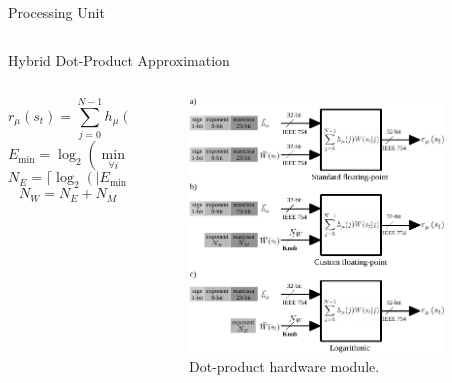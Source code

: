 \begin{frame}{Processing Unit}
\begin{columns}[c]
	\end{columns}
\end{frame}

\begin{frame}{Hybrid Dot-Product Approximation}
	\begin{columns}[c] %
		\begin{column}{0.5\textwidth}
			\scriptsize
			\vspace{5mm}
			\begin{equation}
			r_{\mu}\left(s_t\right)=\sum_{j=0}^{N-1}h_{\mu}(j)W(s_t|j)
			\end{equation}
			\vspace{5mm} 
			\begin{equation}
			E_{\min}=\log _2(\min_{\forall i}(W(i)))
			\end{equation}
			\vspace{5mm} 
			\begin{equation}
			N_E=\lceil\log_2(|E_{\min}|)\rceil
			\end{equation}
			\vspace{5mm} 
			\begin{equation}
			N_W=N_E + N_M
			\end{equation}
		\end{column}
		
		\begin{column}{0.5\textwidth}
			\begin{figure}
				\centering
				\includegraphics[width=0.9\textwidth]{../chapters/sbs_accelerator/figures/dot-product_unit.pdf} %
				\caption{\scriptsize Dot-product hardware module.}
			\end{figure}
		\end{column}
	\end{columns}
\end{frame}

